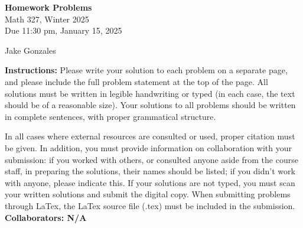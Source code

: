 \documentclass [10pt]{article}
\newcommand{\jg}[1]{{\color{blue} #1}}
\begin{document}
\begin{center}
{\bf Homework Problems}\\
Math 327, Winter 2025\\
Due 11:30 pm, January 15, 2025
\end{center}

\begin{center}
\jg{
    Jake Gonzales}
\end{center}

{\bf Instructions:} Please write your solution to each problem on a separate page,
and please include the
full problem statement at the top of the page. All solutions must be written in
legible handwriting
or typed (in each case, the text should be of a reasonable size).
Your solutions to all problems should be written in complete sentences, with proper
grammatical
structure.

In all cases where external resources are consulted or used, proper citation must
be given. In addition,
you must provide information on collaboration with your submission: if you worked
with others,
or consulted anyone aside from the course staff, in preparing the solutions, their
names should be
listed; if you didn't work with anyone, please indicate this.
If your solutions are not typed, you must scan your written solutions and submit
the digital copy. When submitting problems through LaTex, the LaTex source file
(.tex) must be included in the submission. \\

\jg{
\textbf{Collaborators: N/A }
}
\end{document}
